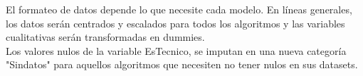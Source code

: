 
El formateo de datos depende lo que necesite cada modelo. En líneas generales, los datos serán centrados y escalados para todos los algoritmos y las variables cualitativas serán transformadas en dummies. \\

Los valores nulos de la variable EsTecnico, se imputan en una nueva categoría "Sindatos" para aquellos algoritmos que necesiten no tener nulos en sus datasets. 



